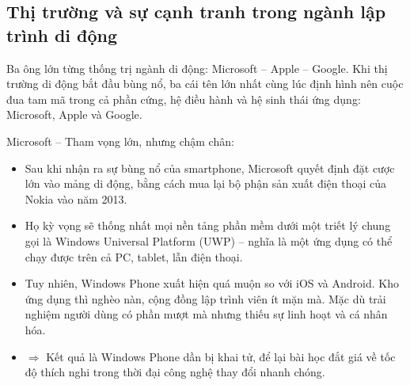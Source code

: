 \subsection{Thị trường và sự cạnh tranh trong ngành lập trình di động}
\renewcommand{\labelitemi}{--}    
    \begin{flushleft}
        \hspace*{0.8cm}Ba ông lớn từng thống trị ngành di động: Microsoft – Apple – Google. Khi thị trường di động bắt đầu bùng nổ, ba cái tên lớn nhất cùng lúc định hình nên cuộc đua tam mã trong cả phần cứng, hệ điều hành và hệ sinh thái ứng dụng: Microsoft, Apple và Google.
    \end{flushleft}

    \begin{flushleft}
      \hspace*{0.8cm}Microsoft – Tham vọng lớn, nhưng chậm chân:
      \setlength{\leftmargini}{1.5cm}
      \begin{itemize}
          \item Sau khi nhận ra sự bùng nổ của smartphone, Microsoft quyết định đặt cược lớn vào mảng di động, bằng cách mua lại bộ phận sản xuất điện thoại của Nokia vào năm 2013.
          \item Họ kỳ vọng sẽ thống nhất mọi nền tảng phần mềm dưới một triết lý chung gọi là Windows Universal Platform (UWP) – nghĩa là một ứng dụng có thể chạy được trên cả PC, tablet, lẫn điện thoại.
          \item Tuy nhiên, Windows Phone xuất hiện quá muộn so với iOS và Android. Kho ứng dụng thì nghèo nàn, cộng đồng lập trình viên ít mặn mà. Mặc dù trải nghiệm người dùng có phần mượt mà nhưng thiếu sự linh hoạt và cá nhân hóa.
          \item[]$\Rightarrow$ Kết quả là Windows Phone dần bị khai tử, để lại bài học đắt giá về tốc độ thích nghi trong thời đại công nghệ thay đổi nhanh chóng.
      \end{itemize}
    \end{flushleft}

